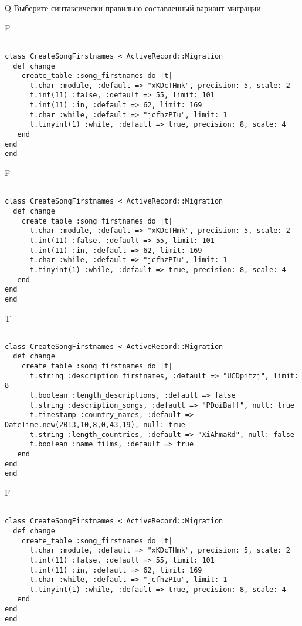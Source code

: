 Q
Выберите синтаксически правильно составленный вариант миграции:

F
\begin{verbatim}
		
class CreateSongFirstnames < ActiveRecord::Migration 
  def change 
    create_table :song_firstnames do |t| 
      t.char :module, :default => "xKDcTHmk", precision: 5, scale: 2
      t.int(11) :false, :default => 55, limit: 101
      t.int(11) :in, :default => 62, limit: 169
      t.char :while, :default => "jcfhzPIu", limit: 1
      t.tinyint(1) :while, :default => true, precision: 8, scale: 4
   end
end
end
\end{verbatim}

F
\begin{verbatim}
		
class CreateSongFirstnames < ActiveRecord::Migration 
  def change 
    create_table :song_firstnames do |t| 
      t.char :module, :default => "xKDcTHmk", precision: 5, scale: 2
      t.int(11) :false, :default => 55, limit: 101
      t.int(11) :in, :default => 62, limit: 169
      t.char :while, :default => "jcfhzPIu", limit: 1
      t.tinyint(1) :while, :default => true, precision: 8, scale: 4
   end
end
end
\end{verbatim}

T
\begin{verbatim}
		
class CreateSongFirstnames < ActiveRecord::Migration 
  def change 
    create_table :song_firstnames do |t| 
      t.string :description_firstnames, :default => "UCDpitzj", limit: 8
      t.boolean :length_descriptions, :default => false
      t.string :description_songs, :default => "PDoiBaff", null: true
      t.timestamp :country_names, :default => DateTime.new(2013,10,8,0,43,19), null: true
      t.string :length_countries, :default => "XiAhmaRd", null: false
      t.boolean :name_films, :default => true
   end
end
end
\end{verbatim}

F
\begin{verbatim}
		
class CreateSongFirstnames < ActiveRecord::Migration 
  def change 
    create_table :song_firstnames do |t| 
      t.char :module, :default => "xKDcTHmk", precision: 5, scale: 2
      t.int(11) :false, :default => 55, limit: 101
      t.int(11) :in, :default => 62, limit: 169
      t.char :while, :default => "jcfhzPIu", limit: 1
      t.tinyint(1) :while, :default => true, precision: 8, scale: 4
   end
end
end
\end{verbatim}

